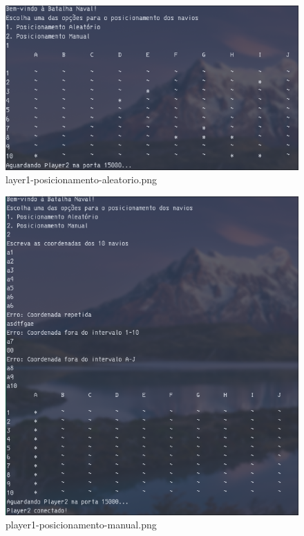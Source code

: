 \documentclass[
	12pt,				%
	oneside,			%
	a4paper,			%
	english,			%
	brazil,				%
	]{abntex2}
\begin{document}
{\begin{figure}[H]
    \centering
    \includegraphics[width=1\textwidth]{imgs/player1-posicionamento-aleatorio.png}
    \caption{layer1-posicionamento-aleatorio.png}
    \label{fig:img1}
\end{figure}
\begin{figure}[H]
    \centering
    \includegraphics[width=1\textwidth]{imgs/player1-posicionamento-manual.png}
    \caption{player1-posicionamento-manual.png}
    \label{fig:img1}
\end{figure}
\begin{figure}[H]

\end{figure}}
\end{document}
